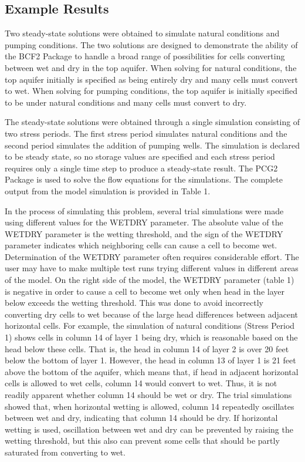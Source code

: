 \subsection{Example Results}

Two steady-state solutions were obtained to simulate natural conditions and pumping conditions. The two solutions are designed to demonstrate the ability of the BCF2 Package to handle a broad range of possibilities for cells converting between wet and dry in the top aquifer. When solving for natural conditions, the top aquifer initially is specified as being entirely dry and many cells must convert to wet. When solving for pumping conditions, the top aquifer is initially specified to be under natural conditions and many cells must convert to dry.

The steady-state solutions were obtained through a single simulation consisting of two stress periods. The first stress period simulates natural conditions and the second period simulates the addition of pumping wells. The simulation is declared to be steady state, so no storage values are specified and each stress period requires only a single time step to produce a steady-state result. The PCG2 Package is used to solve the flow equations for the simulations. The complete output from the model simulation is provided in Table 1.

In the process of simulating this problem, several trial simulations were made using different values for the WETDRY parameter. The absolute value of the WETDRY parameter is the wetting threshold, and the sign of the WETDRY parameter indicates which neighboring cells can cause a cell to become wet. Determination of the WETDRY parameter often requires considerable effort. The user may have to make multiple test runs trying different values in different areas of the model. On the right side of the model, the
WETDRY parameter (table 1) is negative in order to cause a cell to become wet only when head in the layer below exceeds the wetting threshold. This was done to avoid incorrectly converting dry cells to wet because of the large head differences between adjacent horizontal cells. For example, the simulation of natural conditions (Stress Period 1) shows cells in column 14 of layer 1 being dry, which is reasonable based on the head below these cells. That is, the head in column 14 of layer 2 is over 20 feet below the bottom of layer 1. However, the head in column 13 of layer 1 is 21 feet above the bottom of the aquifer, which means that, if head in adjacent horizontal cells is allowed to wet cells, column 14 would convert to wet. Thus, it is not readily apparent whether column 14 should be wet or dry. The trial simulations showed that, when horizontal wetting is allowed, column 14 repeatedly oscillates between wet and dry, indicating that column 14 should be dry. If horizontal wetting is used, oscillation between wet and dry can be prevented by raising the wetting threshold, but this also can prevent some cells that should be partly saturated from converting to wet.

